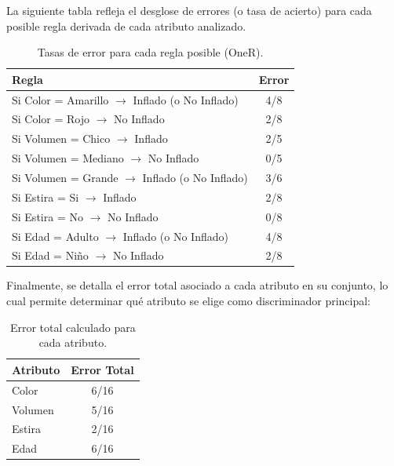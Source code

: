\documentclass{article}
\begin{document}
La siguiente tabla refleja el desglose de errores (o tasa de acierto) para cada posible regla derivada de cada atributo analizado.

\begin{table}[H]
    \centering
    \renewcommand{\arraystretch}{1.2}
    \begin{tabular}{|l|c|}
        \hline
        \textbf{Regla} & \textbf{Error} \\ \hline
        Si Color = Amarillo $\rightarrow$ Inflado (o No Inflado) & 4/8 \\ \hline
        Si Color = Rojo $\rightarrow$ No Inflado & 2/8 \\ \hline
        Si Volumen = Chico $\rightarrow$ Inflado & 2/5 \\ \hline
        Si Volumen = Mediano $\rightarrow$ No Inflado & 0/5 \\ \hline
        Si Volumen = Grande $\rightarrow$ Inflado (o No Inflado) & 3/6 \\ \hline
        Si Estira = Si $\rightarrow$ Inflado & 2/8 \\ \hline
        Si Estira = No $\rightarrow$ No Inflado & 0/8 \\ \hline
        Si Edad = Adulto $\rightarrow$ Inflado (o No Inflado) & 4/8 \\ \hline
        Si Edad = Niño $\rightarrow$ No Inflado & 2/8 \\ \hline
    \end{tabular}
    \caption{Tasas de error para cada regla posible (OneR).}
\end{table}

\vspace{0.3cm}
Finalmente, se detalla el error total asociado a cada atributo en su conjunto, lo cual permite determinar qué atributo se elige como discriminador principal:

\begin{table}[H]
    \centering
    \renewcommand{\arraystretch}{1.2}
    \begin{tabular}{|l|c|}
        \hline
        \textbf{Atributo} & \textbf{Error Total} \\ \hline
        Color & 6/16 \\ \hline
        Volumen & 5/16 \\ \hline
        Estira & 2/16 \\ \hline
        Edad & 6/16 \\ \hline
    \end{tabular}
    \caption{Error total calculado para cada atributo.}
\end{table}
\end{document}
